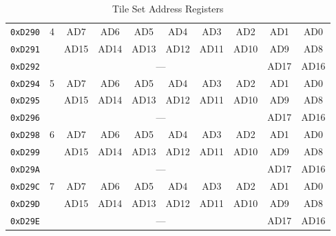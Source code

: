 \begin{table}[h]
\begin{center}
\begin{tabular}{|c|c|c|c|c|c|c|c|c|c|}
            \verb+0xD290+ & \multirow{3}{*}{4} & AD7 & AD6 & AD5 & AD4 & AD3 & AD2 & AD1 & AD0 \\ \cline{1-1}\cline{3-10}
            \verb+0xD291+ &                    & AD15 & AD14 & AD13 & AD12 & AD11 & AD10 & AD9 & AD8 \\ \cline{1-1}\cline{3-10}
            \verb+0xD292+ &                    & \multicolumn{6}{|c|}{---} & AD17 & AD16 \\ \hline\hline

            \verb+0xD294+ & \multirow{3}{*}{5} & AD7 & AD6 & AD5 & AD4 & AD3 & AD2 & AD1 & AD0 \\ \cline{1-1}\cline{3-10}
            \verb+0xD295+ &                    & AD15 & AD14 & AD13 & AD12 & AD11 & AD10 & AD9 & AD8 \\ \cline{1-1}\cline{3-10}
            \verb+0xD296+ &                    & \multicolumn{6}{|c|}{---} & AD17 & AD16 \\ \hline\hline

            \verb+0xD298+ & \multirow{3}{*}{6} & AD7 & AD6 & AD5 & AD4 & AD3 & AD2 & AD1 & AD0 \\ \cline{1-1}\cline{3-10}
            \verb+0xD299+ &                    & AD15 & AD14 & AD13 & AD12 & AD11 & AD10 & AD9 & AD8 \\ \cline{1-1}\cline{3-10}
            \verb+0xD29A+ &                    & \multicolumn{6}{|c|}{---} & AD17 & AD16 \\ \hline\hline

            \verb+0xD29C+ & \multirow{3}{*}{7} & AD7 & AD6 & AD5 & AD4 & AD3 & AD2 & AD1 & AD0 \\ \cline{1-1}\cline{3-10}
            \verb+0xD29D+ &                    & AD15 & AD14 & AD13 & AD12 & AD11 & AD10 & AD9 & AD8 \\ \cline{1-1}\cline{3-10}
            \verb+0xD29E+ &                    & \multicolumn{6}{|c|}{---} & AD17 & AD16 \\ \hline
        \end{tabular}
    \end{center}
    \caption{Tile Set Address Registers}
    \label{tab:tile_set_addr}
\end{table}


